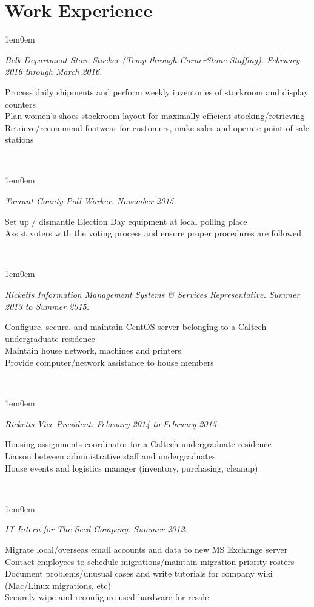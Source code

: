 \documentclass[10pt,letterpaper, full]{article}
\newcommand{\pjtitle}[1]{\renewcommand{\givenpjtitle}{#1}}
\newcommand{\pjtime}[1]{\renewcommand{\givenpjtime}{#1}}
\newcommand{\pjbody}[1]{\renewcommand{\givenpjbody}{#1}}
\newcommand{\givenpjtitle}{REQUIRED!}
\newcommand{\givenpjtime}{REQUIRED!}
\newcommand{\givenpjbody}{REQUIRED!}
\newenvironment{projectenv}
    {
        \begin{adjustwidth}{1em}{0em}
    }
    {
        \textit{\givenpjtitle. \givenpjtime.}

        \begin{minipage}[l]{\textwidth}
            \givenpjbody%
        \end{minipage}\\%


        \end{adjustwidth}
    }
\begin{document}
\section{Work Experience}
\begin{projectenv}%
    \pjtitle{Belk Department Store Stocker (Temp through CornerStone Staffing)}
    \pjtime{February 2016 through March 2016}
    \pjbody{
        Process daily shipments and perform weekly inventories of stockroom and display counters\\
        Plan women's shoes stockroom layout for maximally efficient stocking/retrieving\\
        Retrieve/recommend footwear for customers, make sales and operate point-of-sale stations
    }
\end{projectenv}%

\begin{projectenv}%
    \pjtitle{Tarrant County Poll Worker}
    \pjtime{November 2015}
    \pjbody{
        Set up / dismantle Election Day equipment at local polling place\\
        Assist voters with the voting process and ensure proper procedures are followed
    }
\end{projectenv}%

\newpage

\begin{projectenv}%
    \pjtitle{Ricketts Information Management Systems \& Services Representative}
    \pjtime{Summer 2013 to Summer 2015}
    \pjbody{
        Configure, secure, and maintain CentOS server belonging to a Caltech
        undergraduate residence\\
        Maintain house network, machines and printers\\
        Provide computer/network assistance to house members
    }
\end{projectenv}%

\begin{projectenv}%
    \pjtitle{Ricketts Vice President}
    \pjtime{February 2014 to February 2015}
    \pjbody{
        Housing assignments coordinator for a Caltech undergraduate residence\\
        Liaison between administrative staff and undergraduates\\
        House events and logistics manager (inventory, purchasing, cleanup)
    }
\end{projectenv}%

\begin{projectenv}%
    \pjtitle{IT Intern for The Seed Company}
    \pjtime{Summer 2012}
    \pjbody{
        Migrate local/overseas email accounts and data to new MS Exchange server\\
        Contact employees to schedule migrations/maintain migration priority rosters\\
        Document problems/unusual cases and write tutorials for company wiki (Mac/Linux migrations, etc)\\
        Securely wipe and reconfigure used hardware for resale
    }
\end{projectenv}%
\end{document}
